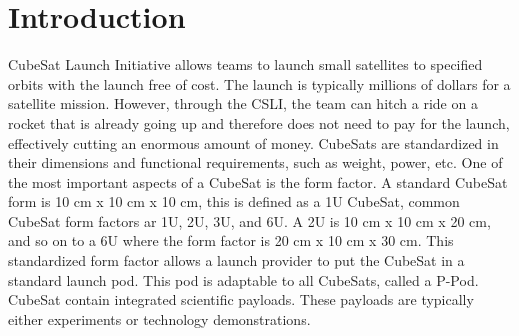 \documentclass[conference]{IEEEtran} %
\begin{document}
\label{sec:nomenclature}
\newcommand{\nomunit}[1]{%
\renewcommand{\nomentryend}{\hspace*{\fill}#1}}
\renewcommand{\nompreamble}{

  }



\section{Introduction}
\label{sec:introduction}
 CubeSat Launch Initiative allows teams to launch small satellites to specified orbits with the launch free of cost. The launch is typically millions of dollars for a
satellite mission. However, through the CSLI, the team can hitch a ride on a rocket that is already going up and therefore does not need to pay for the launch, effectively cutting
an enormous amount of money. CubeSats are standardized in their dimensions and functional requirements, such as weight, power, etc. One of the most important aspects of
a CubeSat is the form factor. A standard CubeSat form is 10 cm x 10 cm x 10 cm, this is defined as a 1U CubeSat, common CubeSat form factors ar 1U, 2U, 3U, and 6U.
A 2U is 10 cm x 10 cm x 20 cm, and so on to a 6U where the form factor is 20 cm x 10 cm x 30 cm. This standardized form factor allows a launch provider to put the CubeSat in a
standard launch pod. This pod is adaptable to all CubeSats, called a P-Pod. CubeSat contain integrated scientific payloads. These payloads are typically either experiments or technology
demonstrations.
\end{document}
